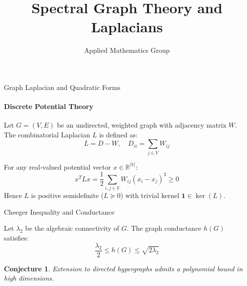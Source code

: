 \documentclass{beamer}
\title{Spectral Graph Theory and Laplacians}
\author{Applied Mathematics Group}
\newtheorem{conjecture}{Conjecture}
\begin{document}
\begin{frame}{Graph Laplacian and Quadratic Forms}
  \framesubtitle{Discrete Potential Theory}
  Let $G = (V, E)$ be an undirected, weighted graph with adjacency matrix $W$.
  The combinatorial Laplacian $L$ is defined as:
  \begin{equation}
    L = D - W, \quad D_{ii} = \sum_{j \in V} W_{ij}
  \end{equation}

  \pause
  For any real-valued potential vector $x \in \mathbb{R}^{|V|}$:
  \begin{equation}
    x^T L x = \frac{1}{2} \sum_{i,j \in V} W_{ij} (x_i - x_j)^2 \ge 0
  \end{equation}
  \pause
  Hence $L$ is positive semidefinite ($L \succeq 0$) with trivial kernel $\mathbf{1} \in \ker(L)$.
\end{frame}

\begin{frame}{Cheeger Inequality and Conductance}
  \begin{theorem}
    Let $\lambda_2$ be the algebraic connectivity of $G$. The graph conductance $h(G)$ satisfies:
    \begin{equation*}
      \frac{\lambda_2}{2} \le h(G) \le \sqrt{2 \lambda_2}
    \end{equation*}
  \end{theorem}

  \begin{conjecture}
    Extension to directed hypergraphs admits a polynomial bound in high dimensions.
  \end{conjecture}
\end{frame}
\end{document}
